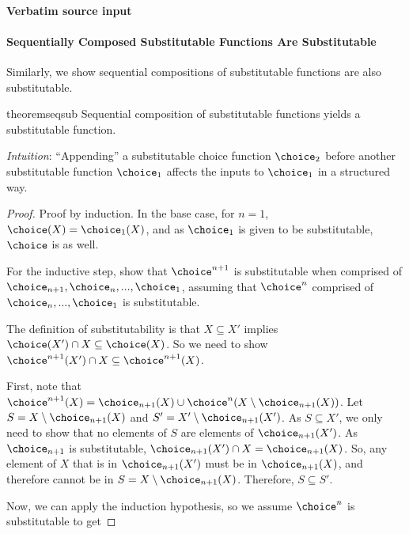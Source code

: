 \documentclass[10pt]{article}
\begin{document}
\paragraph{Verbatim source input}
\begin{ReviewVerbatim}
\paragraph{Sequentially Composed Substitutable Functions Are Substitutable}
Similarly, we show sequential compositions of substitutable functions are also substitutable.
\begin{restatable}{theorem}{seqsub}
\label{thm:composition-substitutable}
Sequential composition of substitutable functions yields a substitutable function.
\end{restatable}

\textit{Intuition}:
``Appending'' a substitutable choice function $\choice_2$ before another substitutable function $\choice_1$ affects the inputs to $\choice_1$ in a structured way.
\begin{proof}
    Proof by induction.
    In the base case, for $n = 1$, $\choice(X) = \choice_1(X)$, and as $\choice_1$ is given to be substitutable, $\choice$ is as well.

    For the inductive step, show that $\choice^{n+1}$ is substitutable when comprised of $\choice_{n+1}, \choice_n, ..., \choice_1$, assuming that $\choice^n$ comprised of $\choice_n,...,\choice_1$ is substitutable.

    The definition of substitutability is that $X \subseteq X'$ implies $\choice(X') \cap X \subseteq \choice(X)$. So we need to show $\choice^{n+1}(X') \cap X \subseteq \choice^{n+1}(X)$.

    First, note that $\choice^{n+1}(X) = \choice_{n+1}(X) \cup \choice^n(X \setminus \choice_{n+1}(X))$.
    Let $S = X \setminus \choice_{n+1}(X)$ and $S' = X' \setminus \choice_{n+1}(X')$. As $S \subseteq X'$, we only need to show that no elements of $S$ are elements of $\choice_{n+1}(X')$. As $\choice_{n+1}$ is substitutable, $\choice_{n+1}(X') \cap X = \choice_{n+1}(X)$. So, any element of $X$ that is in $\choice_{n+1}(X') $ must be in $\choice_{n+1}(X)$, and therefore cannot be in $S = X \setminus \choice_{n+1}(X)$. Therefore, $S \subseteq S'$.

    Now, we can apply the induction hypothesis, so we assume $\choice^n$ is substitutable to get


\end{proof}
\end{ReviewVerbatim}
\end{document}
